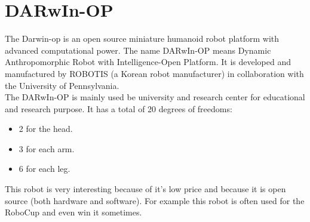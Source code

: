 \documentclass[a4paper, 12pt]{article}  		%
\begin{document}

\newpage
\thispagestyle{empty}
\setcounter{page}{0}

\begin{spacing}{0.9}
\tableofcontents
\thispagestyle{empty}
\end{spacing}


\newpage
\section{DARwIn-OP}
The Darwin-op is an open source miniature humanoid robot platform with advanced computational power. The name DARwIn-OP means Dynamic Anthropomorphic Robot with Intelligence-Open Platform. It is developed and manufactured by ROBOTIS (a Korean robot manufacturer) in collaboration with the University of Pennsylvania.\\

The DARwIn-OP is mainly used be university and research center for educational and research purpose. It has a total of 20 degrees of freedoms:
\begin{itemize}
\item 2 for the head.
\item 3 for each arm.
\item 6 for each leg.
\end{itemize}

This robot is very interesting because of it's low price and because it is open source (both hardware and software). For example this robot is often used for the RoboCup and even win it sometimes.\\
\end{document}
